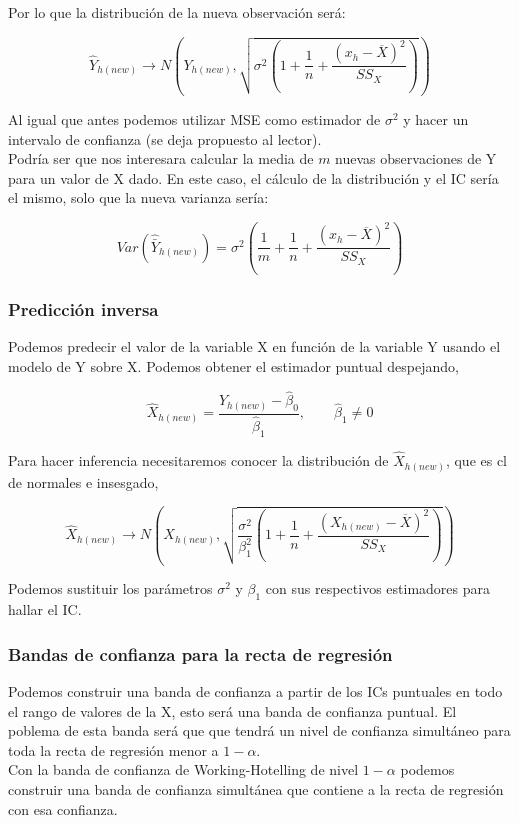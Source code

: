Por lo que la distribución de la nueva observación será:

$$
\hat Y_{h(new)}\longrightarrow N\left(Y_{h(new)},\sqrt{\sigma^2\left(1+\frac{1}{n}+\frac{(x_h-\overline{X})^2}{SS_X}\right)}\right)
$$

Al igual que antes podemos utilizar MSE como estimador de $\sigma^2$ y hacer un intervalo de confianza (se deja propuesto al lector).\\

Podría ser que nos interesara calcular la media de $m$ nuevas observaciones de Y para un valor de X dado. En este caso, el cálculo de la distribución y el IC sería el mismo, solo que la nueva varianza sería:

$$
Var(\hat{\bar{Y}}_{h(new)})=\sigma^2\left(\frac{1}{m}+\frac{1}{n}+\frac{(x_h-\overline{X})^2}{SS_X}\right)
$$

\subsubsection{Predicción inversa}

Podemos predecir el valor de la variable X en función de la variable Y usando el modelo de Y sobre X. Podemos obtener el estimador puntual despejando,

$$
\hat X_{h(new)}=\frac{Y_{h(new)}-\hat\beta_0}{\hat\beta_1},\quad\quad\hat\beta_1\neq 0
$$

Para hacer inferencia necesitaremos conocer la distribución de $\hat X_{h(new)}$, que es cl de normales e insesgado,

$$
\hat X_{h(new)}\longrightarrow N\left(X_{h(new)}, \sqrt{\frac{\sigma^2}{\beta_1^2}\left(1+\frac{1}{n}+\frac{(X_{h(new)}-\overline{X})^2}{SS_X}\right)}\right)
$$

Podemos sustituir los parámetros $\sigma^2$ y $\beta_1$ con sus respectivos estimadores para hallar el IC.

\subsubsection{Bandas de confianza para la recta de regresión}

Podemos construir una banda de confianza a partir de los ICs puntuales en todo el rango de valores de la X, esto será una banda de confianza puntual. El poblema de esta banda será que que tendrá un nivel de confianza simultáneo para toda la recta de regresión menor a $1-\alpha$.\\
Con la banda de confianza de Working-Hotelling de nivel $1-\alpha$ podemos construir una banda de confianza simultánea que contiene a la recta de regresión con esa confianza.

